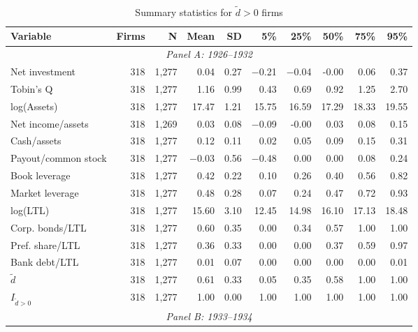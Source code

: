 \begin{table}[p]\centering
    \caption{\\ Summary statistics for $\tilde{d} > 0$ firms}\scriptsize
    \label{tabapp:summary_I_0}
    \begin{threeparttable}
        \begin{tabular}{lrrrrrrrrr}
            \toprule
            Variable & Firms & N & Mean & SD & 5\% & 25\% & 50\% & 75\% & 95\% \\
            \midrule
            \multicolumn{10}{c}{\textit{Panel A: 1926--1932}} \\
            \midrule
            Net investment & 318 & 1,277 & 0.04 & 0.27 & $-$0.21 & $-$0.04 & -0.00 & 0.06 & 0.37 \\
            Tobin's Q & 318 & 1,277 & 1.16 & 0.99 & 0.43 & 0.69 & 0.92 & 1.25 & 2.70 \\
            log(Assets) & 318 & 1,277 & 17.47 & 1.21 & 15.75 & 16.59 & 17.29 & 18.33 & 19.55 \\
            Net income/assets & 318 & 1,269 & 0.03 & 0.08 & $-$0.09 & -0.00 & 0.03 & 0.08 & 0.15 \\
            Cash/assets & 318 & 1,277 & 0.12 & 0.11 & 0.02 & 0.05 & 0.09 & 0.15 & 0.31 \\
            Payout/common stock & 318 & 1,277 & $-$0.03 & 0.56 & $-$0.48 & 0.00 & 0.00 & 0.08 & 0.24 \\
            Book leverage & 318 & 1,277 & 0.42 & 0.22 & 0.10 & 0.26 & 0.40 & 0.56 & 0.82 \\
            Market leverage & 318 & 1,277 & 0.48 & 0.28 & 0.07 & 0.24 & 0.47 & 0.72 & 0.93 \\
            log(LTL) & 318 & 1,277 & 15.60 & 3.10 & 12.45 & 14.98 & 16.10 & 17.13 & 18.48 \\
            Corp. bonds/LTL & 318 & 1,277 & 0.60 & 0.35 & 0.00 & 0.34 & 0.57 & 1.00 & 1.00 \\
            Pref. share/LTL & 318 & 1,277 & 0.36 & 0.33 & 0.00 & 0.00 & 0.37 & 0.59 & 0.97 \\
            Bank debt/LTL & 318 & 1,277 & 0.01 & 0.07 & 0.00 & 0.00 & 0.00 & 0.00 & 0.01 \\
            \ensuremath{\tilde{d}} & 318 & 1,277 & 0.61 & 0.33 & 0.05 & 0.35 & 0.58 & 1.00 & 1.00 \\
            \ensuremath{I_{\tilde{d}>0}} & 318 & 1,277 & 1.00 & 0.00 & 1.00 & 1.00 & 1.00 & 1.00 & 1.00 \\
            \midrule
            \multicolumn{10}{c}{\textit{Panel B: 1933--1934}} \\

\end{tabular}
\end{threeparttable}
\end{table}
